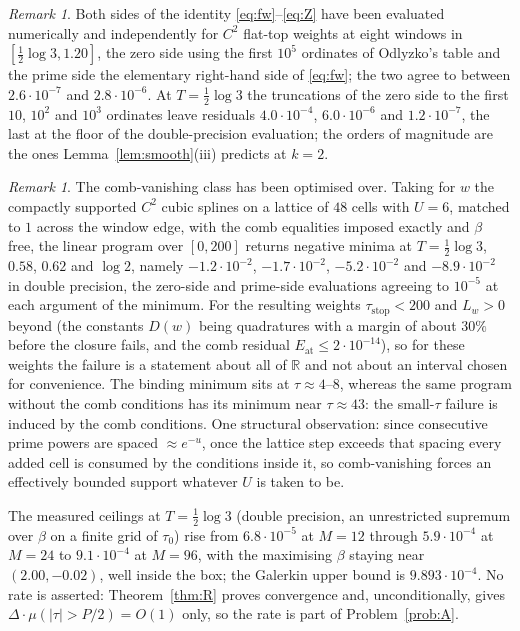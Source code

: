 \documentclass[11pt]{amsart}
\theoremstyle{definition}
\theoremstyle{remark}
\newtheorem{remark}[theorem]{Remark}
\newcommand{\R}{\mathbb R}
\begin{document}
\begin{remark}\label{rem:Zcheck}
Both sides of the identity \eqref{eq:fw}--\eqref{eq:Z} have been evaluated numerically and
independently for $C^2$ flat-top weights at eight windows in $[\frac12\log3,1.20]$, the zero side
using the first $10^5$ ordinates of Odlyzko's table and the prime side the elementary right-hand
side of \eqref{eq:fw}; the two agree to between $2.6\cdot10^{-7}$ and $2.8\cdot10^{-6}$. At
$T=\frac12\log3$ the truncations of the zero side to the first $10$, $10^2$ and $10^3$ ordinates
leave residuals $4.0\cdot10^{-4}$, $6.0\cdot10^{-6}$ and $1.2\cdot10^{-7}$, the last at the floor of
the double-precision evaluation; the orders of magnitude are the ones Lemma~\ref{lem:smooth}(iii)
predicts at $k=2$.
\end{remark}

\begin{remark}\label{rem:comblp}
The comb-vanishing class has been optimised over. Taking for $w$ the compactly supported $C^2$
cubic splines on a lattice of $48$ cells with $U=6$, matched to $1$ across the window edge, with the
comb equalities imposed exactly and $\beta$ free, the linear program over $[0,200]$ returns
negative minima at $T=\frac12\log3$, $0.58$, $0.62$ and $\log2$, namely $-1.2\cdot10^{-2}$,
$-1.7\cdot10^{-2}$, $-5.2\cdot10^{-2}$ and $-8.9\cdot10^{-2}$ in double precision, the zero-side and
prime-side evaluations agreeing to $10^{-5}$ at each argument of the minimum. For the resulting
weights $\tau_{\mathrm{stop}}<200$ and $L_w>0$ beyond (the constants $D(w)$ being quadratures with
a margin of about $30\%$ before the closure fails, and the comb residual $E_{\mathrm{at}}\le2\cdot10^{-14}$),
so for these weights the failure is a statement about all of $\R$ and not about an interval chosen
for convenience. The binding minimum sits at $\tau\approx4$--$8$, whereas the same program without
the comb conditions has its minimum near $\tau\approx43$: the small-$\tau$ failure is induced by
the comb conditions. One structural observation: since
consecutive prime powers are spaced $\approx e^{-u}$, once the lattice step exceeds that spacing
every added cell is consumed by the conditions inside it, so comb-vanishing forces an effectively
bounded support whatever $U$ is taken to be.
\end{remark}

The measured ceilings at $T=\frac12\log3$ (double precision, an unrestricted
supremum over $\beta$ on a finite grid of $\tau_0$) rise from $6.8\cdot10^{-5}$ at $M=12$ through
$5.9\cdot10^{-4}$ at $M=24$ to $9.1\cdot10^{-4}$ at $M=96$, with the maximising $\beta$ staying near
$(2.00,-0.02)$, well inside the box; the Galerkin upper bound is $9.893\cdot10^{-4}$. No rate is
asserted: Theorem~\ref{thm:R} proves convergence and, unconditionally, gives $\Delta\cdot\mu(|\tau|>P/2)=O(1)$
only, so the rate is part of Problem~\ref{prob:A}.
\end{document}
